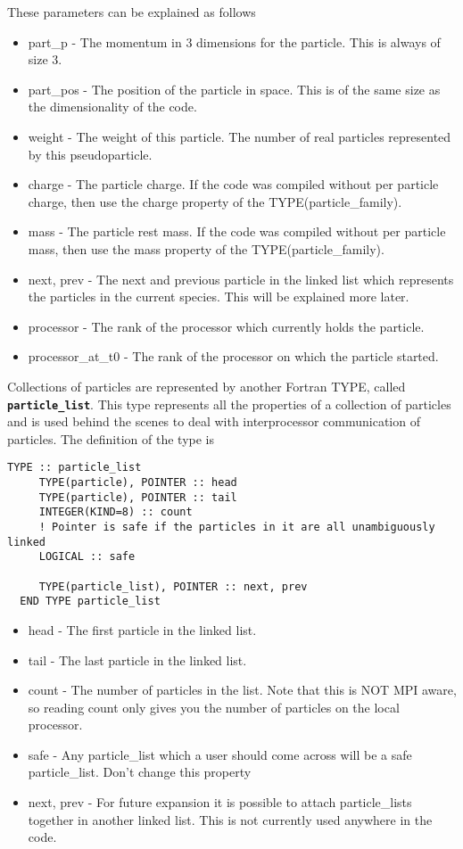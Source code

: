 \documentclass[12pt,a4paper]{article}
\newcommand{\simpleboxverbatim}{\begin{Verbatim}[obeytabs=true,frame=single,
  framerule=0.5mm,rulecolor=\color{warwickmid},formatcom=\color{black}]}
\newcommand{\inlinecode}[1]{{\color{warwickred} \bf\texttt{#1}}}
\begin{document}
These parameters can be explained as follows
\begin{itemize}
\item part\_p - The momentum in 3 dimensions for the particle. This is always
  of size 3.
\item part\_pos - The position of the particle in space. This is of the same
  size as the dimensionality of the code.
\item weight - The weight of this particle. The number of real particles
  represented by this pseudoparticle.
\item charge - The particle charge. If the code was compiled without per
  particle charge, then use the charge property of the TYPE(particle\_family).
\item mass - The particle rest mass. If the code was compiled without per
  particle mass, then use the mass property of the TYPE(particle\_family).
\item next, prev - The next and previous particle in the linked list which
  represents the particles in the current species. This will be explained more
  later.
\item processor - The rank of the processor which currently holds the
  particle.
\item processor\_at\_t0 - The rank of the processor on which the particle
  started.
\end{itemize}

Collections of particles are represented by another Fortran TYPE, called
\inlinecode{particle\_list}. This type represents all the properties of a
collection of particles and is used behind the scenes to deal with
interprocessor communication of particles. The definition of the type is

\simpleboxverbatim
  TYPE :: particle_list
     TYPE(particle), POINTER :: head
     TYPE(particle), POINTER :: tail
     INTEGER(KIND=8) :: count
     ! Pointer is safe if the particles in it are all unambiguously linked
     LOGICAL :: safe

     TYPE(particle_list), POINTER :: next, prev
  END TYPE particle_list
\end{Verbatim}
\begin{itemize}
\item head - The first particle in the linked list.
\item tail - The last particle in the linked list.
\item count - The number of particles in the list. Note that this is NOT MPI
  aware, so reading count only gives you the number of particles on the local
  processor.
\item safe - Any particle\_list which a user should come across will be a safe
  particle\_list. Don't change this property
\item next, prev - For future expansion it is possible to attach particle\_lists
  together in another linked list. This is not currently used anywhere in the
  code.
\end{itemize}
\end{document}
